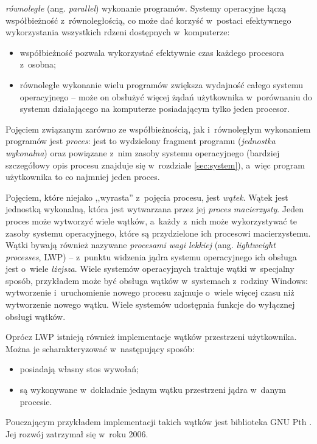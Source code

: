 \documentclass[12pt]{mwart}
\begin{document}
  \emph{równoległe} (ang. \emph{parallel}) wykonanie programów. Systemy operacyjne łączą współbieżność z~równoległością, co może dać korzyść w~postaci
  efektywnego wykorzystania wszystkich rdzeni dostępnych w~komputerze:
  \begin{itemize}
    \item współbieżność pozwala wykorzystać efektywnie czas każdego procesora z~osobna;
    \item równoległe wykonanie wielu programów zwiększa wydajność całego systemu operacyjnego -- może on obsłużyć więcej żądań użytkownika w~porównaniu do
      systemu działającego na komputerze posiadającym tylko jeden procesor.
  \end{itemize}
\par
\indent
  Pojęciem związanym zarówno ze współbieżnością, jak i~równoległym wykonaniem programów jest \emph{proces}: jest to wydzielony fragment programu (\emph{jednostka wykonalna})
  oraz powiązane z~nim zasoby systemu operacyjnego (bardziej szczegółowy opis procesu znajduje się w~rozdziale \ref{sec:system}),
  a~więc program użytkownika to co najmniej jeden proces.
\par
\indent
  Pojęciem, które niejako ,,wyrasta'' z~pojęcia procesu, jest \emph{wątek}. Wątek jest jednostką wykonalną, która jest wytwarzana przez jej \emph{proces macierzysty}.
  Jeden proces może wytworzyć wiele wątków, a~każdy z~nich może wykorzystywać te zasoby systemu operacyjnego, które są przydzielone ich procesowi macierzystemu.
  Wątki bywają również nazywane \emph{procesami wagi lekkiej} (ang. \emph{lightweight processes}, LWP) -- z~punktu widzenia jądra systemu operacyjnego
  ich obsługa jest o~wiele \emph{lżejsza}.
  Wiele systemów operacyjnych traktuje wątki w~specjalny sposób, przykładem może być obsługa wątków w~systemach z~rodziny Windows:
  wytworzenie i~uruchomienie nowego procesu zajmuje o~wiele więcej czasu niż wytworzenie nowego wątku. Wiele systemów
  udostępnia funkcje do wyłącznej obsługi wątków.
\par
%
\indent
  Oprócz LWP istnieją również implementacje wątków przestrzeni użytkownika. Można je scharakteryzować w~następujący sposób:
  \begin{itemize}
    \item posiadają własny stos wywołań;
    \item są wykonywane w~dokładnie jednym wątku przestrzeni jądra w~danym procesie.
  \end{itemize}
  Pouczającym przykładem implementacji takich wątków jest biblioteka GNU Pth \cite{pth}. Jej rozwój zatrzymał się w~roku 2006.
\end{document}
